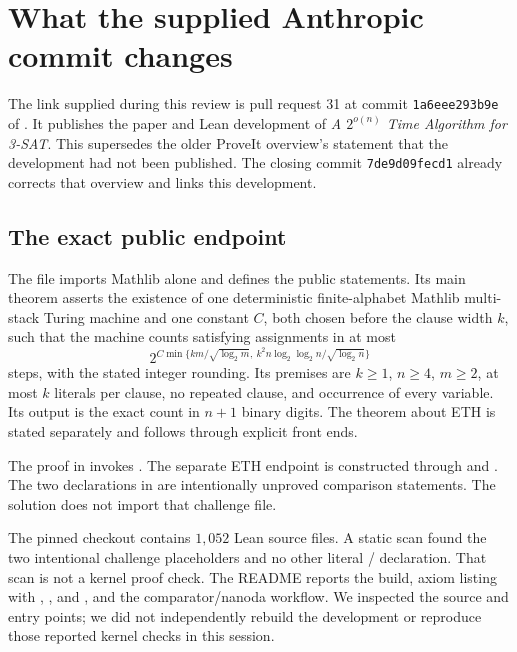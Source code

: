 \section{What the supplied Anthropic commit changes}
\label{sec:formal}

The link supplied during this review is pull request 31 at commit
\texttt{1a6eee293b9e} of
 \cite{anthpr}. It publishes the paper and
Lean development of \emph{A $2^{o(n)}$ Time Algorithm for 3-SAT}.
This supersedes the older ProveIt overview's statement that the development
had not been published. The closing commit \texttt{7de9d09fecd1} already
corrects that overview and links this development.

\subsection{The exact public endpoint}

The file  imports Mathlib alone and defines
the public statements. Its main theorem asserts the existence of one
deterministic finite-alphabet Mathlib multi-stack Turing machine and one
constant $C$, both chosen before the clause width $k$, such that the machine
counts satisfying assignments in at most
\begin{equation}\label{eq:anth-main}
 2^{C\min\{km/\sqrt{\log_2m},\ k^2n\log_2\log_2n/\sqrt{\log_2n}\}}
\end{equation}
steps, with the stated integer rounding. Its premises are $k\ge1$,
$n\ge4$, $m\ge2$, at most $k$ literals per clause, no repeated clause,
and occurrence of every variable. Its output is the exact count in $n+1$
binary digits. The theorem about ETH is stated separately and follows
through explicit front ends.

The proof in  invokes
. The separate ETH endpoint is
constructed through  and . The two  declarations
in  are intentionally unproved comparison
statements. The solution does not import that challenge file.

The pinned checkout contains $1{,}052$ Lean source files. A static scan
found the two intentional challenge placeholders and no other literal
/ declaration. That scan is not a kernel proof
check. The README reports the build, axiom listing with
, , and , and
the comparator/nanoda workflow. We inspected the source and entry points;
we did not independently rebuild the development or reproduce those
reported kernel checks in this session.

